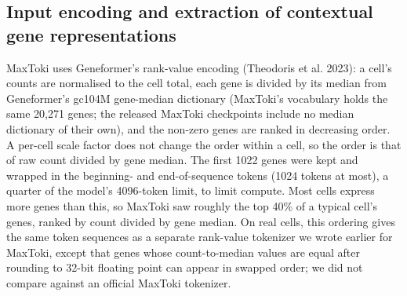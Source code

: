 \documentclass[
  11pt,
]{article}
\begin{document}
\subsection{Input encoding and extraction of contextual gene
representations}\label{input-encoding-and-extraction-of-contextual-gene-representations}

MaxToki uses Geneformer's rank-value encoding (Theodoris et al. 2023): a
cell's counts are normalised to the cell total, each gene is divided by
its median from Geneformer's gc104M gene-median dictionary (MaxToki's
vocabulary holds the same 20,271 genes; the released MaxToki checkpoints
include no median dictionary of their own), and the non-zero genes are
ranked in decreasing order. A per-cell scale factor does not change the
order within a cell, so the order is that of raw count divided by gene
median. The first 1022 genes were kept and wrapped in the beginning- and
end-of-sequence tokens (1024 tokens at most), a quarter of the model's
4096-token limit, to limit compute. Most cells express more genes than
this, so MaxToki saw roughly the top 40\% of a typical cell's genes,
ranked by count divided by gene median. On real cells, this ordering
gives the same token sequences as a separate rank-value tokenizer we
wrote earlier for MaxToki, except that genes whose count-to-median
values are equal after rounding to 32-bit floating point can appear in
swapped order; we did not compare against an official MaxToki tokenizer.
\end{document}
